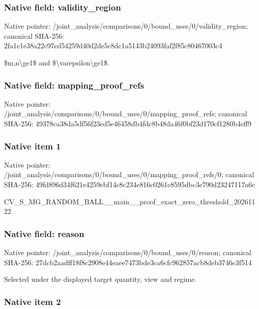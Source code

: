 \documentclass[10pt,a4paper]{article}
\begin{document}
\subsubsection{Native field: validity\_region}


Native pointer: /joint\_analysis/comparis\allowbreak{}ons/0/bound\_uses/0/valid\allowbreak{}ity\_region; canonical SHA-256: 2fa1e1e38a22c97ed54259d4\allowbreak{}0d2de5c8dc1a5143b24093fa\allowbreak{}f2f85c80467003c4


\$m,n\textbackslash{}ge1\$ and \$\textbackslash{}varepsilon\textbackslash{}ge1\$.


\subsubsection{Native field: mapping\_proof\_refs}


Native pointer: /joint\_analysis/comparis\allowbreak{}ons/0/bound\_uses/0/mappi\allowbreak{}ng\_proof\_refs; canonical SHA-256: 49378ca38da5df56f23ed5e4\allowbreak{}6458db4fdc8b48da46f0bf23\allowbreak{}d170cf1280b4eff9



\subsubsection{Native item 1}


Native pointer: /joint\_analysis/comparis\allowbreak{}ons/0/bound\_uses/0/mappi\allowbreak{}ng\_proof\_refs/0; canonical SHA-256: 49fd896d34f621e4259ebf14\allowbreak{}c8c234e816c0261c8595dbc3\allowbreak{}e790d23247117a6c


CV\_S\_MG\_RANDOM\_BALL\_\_mai\allowbreak{}n\_\_proof\_exact\_zero\_thre\allowbreak{}shold\_20261122


\subsubsection{Native field: reason}


Native pointer: /joint\_analysis/comparis\allowbreak{}ons/0/bound\_uses/0/reaso\allowbreak{}n; canonical SHA-256: 27dcb2aadff18f8c2908e44e\allowbreak{}aee7473bde3ca6cfc962857a\allowbreak{}cb8deb3746c3f514


Selected under the displayed target quantity, view and regime.


\subsubsection{Native item 2}
\end{document}
